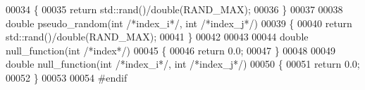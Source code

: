 \begin{DoxyCode}
00034 \{
00035   \textcolor{keywordflow}{return} std::rand()/double(RAND\_MAX);
00036 \}
00037 
00038 \textcolor{keywordtype}{double} pseudo\_random(\textcolor{keywordtype}{int} \textcolor{comment}{/*index\_i*/}, \textcolor{keywordtype}{int} \textcolor{comment}{/*index\_j*/})
00039 \{
00040   \textcolor{keywordflow}{return} std::rand()/double(RAND\_MAX);
00041 \}
00042 
00043 
00044 \textcolor{keywordtype}{double} null\_function(\textcolor{keywordtype}{int} \textcolor{comment}{/*index*/})
00045 \{
00046   \textcolor{keywordflow}{return} 0.0;
00047 \}
00048 
00049 \textcolor{keywordtype}{double} null\_function(\textcolor{keywordtype}{int} \textcolor{comment}{/*index\_i*/}, \textcolor{keywordtype}{int} \textcolor{comment}{/*index\_j*/})
00050 \{
00051   \textcolor{keywordflow}{return} 0.0;
00052 \}
00053 
00054 \textcolor{preprocessor}{#endif}
\end{DoxyCode}

